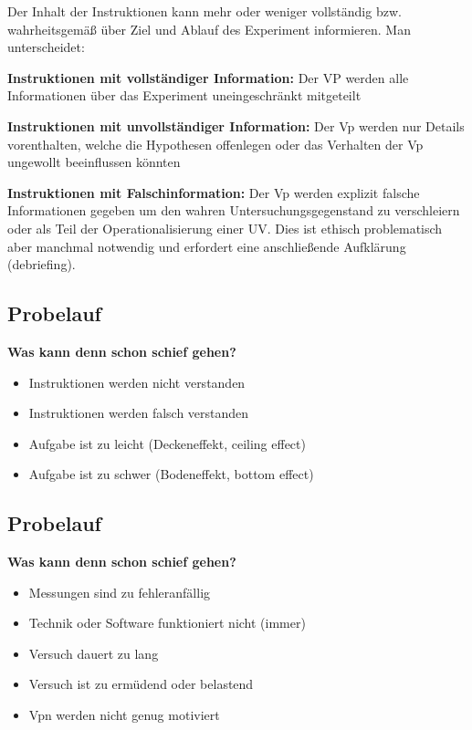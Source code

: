 \documentclass[
]{book}
\begin{document}
Der Inhalt der Instruktionen kann mehr oder weniger vollständig bzw. wahrheitsgemäß über Ziel
und Ablauf des Experiment informieren. Man unterscheidet:

\textbf{Instruktionen mit vollständiger Information:}
Der VP werden alle Informationen über das
Experiment uneingeschränkt mitgeteilt

\textbf{Instruktionen mit unvollständiger Information:}
Der Vp werden nur Details vorenthalten,
welche die Hypothesen offenlegen oder das Verhalten der Vp ungewollt beeinflussen
könnten

\textbf{Instruktionen mit Falschinformation:}
Der Vp werden explizit falsche Informationen gegeben
um den wahren Untersuchungsgegenstand zu verschleiern oder als Teil der
Operationalisierung einer UV. Dies ist ethisch problematisch aber manchmal notwendig und
erfordert eine anschließende Aufklärung (debriefing).

\hypertarget{probelauf}{%
\subsection{Probelauf}\label{probelauf}}

\textbf{Was kann denn schon schief gehen?}

\begin{itemize}
\item
  Instruktionen werden nicht verstanden
\item
  Instruktionen werden falsch verstanden
\item
  Aufgabe ist zu leicht (Deckeneffekt, ceiling effect)
\item
  Aufgabe ist zu schwer (Bodeneffekt, bottom effect)
\end{itemize}

\hypertarget{probelauf-1}{%
\subsection{Probelauf}\label{probelauf-1}}

\textbf{Was kann denn schon schief gehen?}

\begin{itemize}
\item
  Messungen sind zu fehleranfällig
\item
  Technik oder Software funktioniert nicht (immer)
\item
  Versuch dauert zu lang
\item
  Versuch ist zu ermüdend oder belastend
\item
  Vpn werden nicht genug motiviert
\end{itemize}
\end{document}
